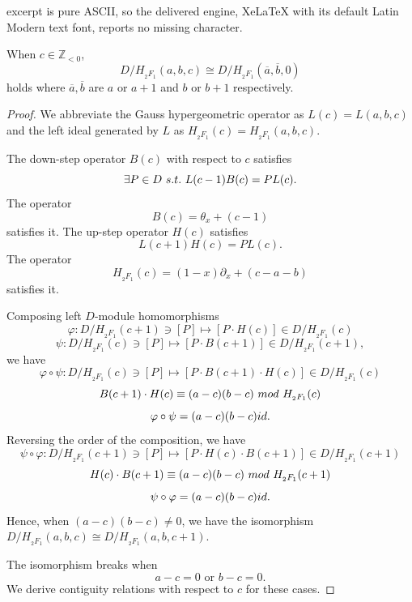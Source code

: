 \documentclass[10pt,a4paper]{amsart}
\def\Hg{H_{{}_2F_1}}
\def\aalpha{a}
\def\bbeta{b}
\def\ggamma{c}
\def\p{\partial}
\begin{document}
excerpt is pure ASCII, so the delivered engine, XeLaTeX with its default Latin Modern text font, reports no missing character.
\begin{proposition} \label{prop:c-isom-gauss-hg}
When $\ggamma \in \mathbb{Z}_{< 0}$,
$$D/\Hg(\aalpha, \bbeta, \ggamma) \cong D/\Hg(\overline{\aalpha}, \overline{\bbeta}, 0)$$ 
holds
where 
$\overline{\aalpha}, \overline{\bbeta}$ are 
$\aalpha$ or $\aalpha+1$ and $\bbeta$ or $\bbeta+1$ respectively.
\end{proposition}

\begin{proof}
We abbreviate the Gauss hypergeometric operator as
$L(\ggamma) = L(\aalpha, \bbeta, \ggamma)$
and the left ideal generated by $L$ as 
$\Hg(\ggamma) = \Hg(\aalpha, \bbeta, \ggamma)$. 

The down-step operator $B(\ggamma)$ with respect to $\ggamma$
satisfies
$$\exists P \in D ~{\rm s.t.}~ L(\ggamma-1) B(\ggamma) = P L(\ggamma). $$
The operator
$$
B(\ggamma) = \theta_x +  (\ggamma - 1)
$$
satisfies it.
The up-step operator $H(\ggamma)$ satisfies 
$$L(\ggamma+1) H(\ggamma) = P L(\ggamma).$$
The operator
$$
\Hg(\ggamma) =  (1-x) \p_x + (\ggamma-\aalpha-\bbeta)
$$
satisfies it.

Composing left $D$-module homomorphisms
$$
\varphi : D/\Hg(\ggamma+1) \ni [P] \mapsto [P \cdot H(\ggamma)] \in D/\Hg(\ggamma)
$$
$$
\psi : D/\Hg(\ggamma) \ni [P] \mapsto [P \cdot B(\ggamma+1)] \in D/\Hg(\ggamma+1),
$$
we have
$$
\varphi \circ \psi : D/\Hg(\ggamma) \ni [P] \mapsto [P \cdot B(\ggamma+1) \cdot H(\ggamma)] \in D/\Hg(\ggamma)
$$ 
$$
B(\ggamma+1) \cdot H(\ggamma) \equiv (\aalpha-\ggamma)(\bbeta-\ggamma) ~{\rm mod}~  \Hg(\ggamma)
$$
$$
\varphi \circ \psi = (\aalpha-\ggamma)(\bbeta-\ggamma) {\rm id}.
$$
Reversing the order of the composition,
we have
$$
\psi \circ \varphi : D/\Hg(\ggamma+1) \ni [P] \mapsto [P \cdot H(\ggamma) \cdot B(\ggamma+1)] \in D/\Hg(\ggamma+1)
$$
$$
H(\ggamma) \cdot B(\ggamma + 1) \equiv (\aalpha-\ggamma)(\bbeta-\ggamma) ~{\rm mod}~  \Hg(\ggamma+1)
$$
$$
\psi \circ \varphi  = (\aalpha-\ggamma)(\bbeta-\ggamma)  {\rm id}. 
$$
Hence, when 
$(\aalpha - \ggamma)(\bbeta - \ggamma) \neq 0$,
we have the isomorphism 
$
D/\Hg(\aalpha, \bbeta, \ggamma) \cong D/\Hg(\aalpha, \bbeta, \ggamma+1)
$.

The isomorphism breaks when
$$\aalpha - \ggamma = 0 \text{ or } \bbeta - \ggamma = 0.$$
We derive contiguity relations with respect to $\ggamma$ 
for these cases.


\end{proof}
\end{document}
